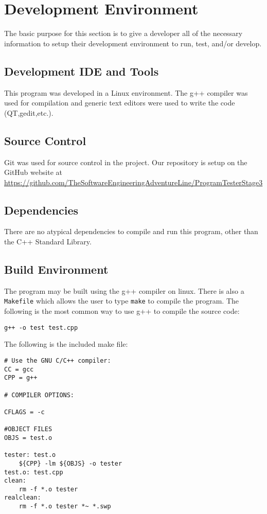 \chapter{Development Environment}
The basic purpose for this section is to give a developer all of the necessary 
information to setup their development environment to run, test, and/or develop. 


\section{Development IDE and Tools}
This program was developed in a Linux environment. The g++ compiler was used for compilation and generic text editors were used to write the code (QT,gedit,etc.).

\section{Source  Control}
Git was used for source control in the project. Our repository is setup on the GitHub website at
\url{https://github.com/TheSoftwareEngineeringAdventureLine/ProgramTesterStage3}


\section{Dependencies}
There are no atypical dependencies to compile and run this program, other than the C++ Standard Library.

\section{Build  Environment}
The program may be built using the g++ compiler on linux. There is also a {\tt Makefile} which allows the user to type {\tt make} to compile the program.
The following is the most common way to use g++ to compile the source code: 

\begin{lstlisting}
g++ -o test test.cpp
\end{lstlisting}

\bigskip
The following is the included make file:

\begin{lstlisting}
# Use the GNU C/C++ compiler:
CC = gcc
CPP = g++

# COMPILER OPTIONS:

CFLAGS = -c

#OBJECT FILES
OBJS = test.o

tester: test.o
	${CPP} -lm ${OBJS} -o tester
test.o: test.cpp
clean:
	rm -f *.o tester
realclean:
	rm -f *.o tester *~ *.swp
\end{lstlisting}


